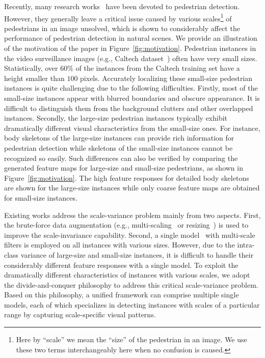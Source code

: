 \documentclass[journal]{IEEEtran}
\begin{document}
Recently, many research works~\cite{ta_cnn,compact,ouyang2013joint,sermanet2013pedestrian} have been devoted to pedestrian detection. However, they generally leave a critical issue caused by various scales\footnote{Here by ``scale'' we mean the ``size'' of the pedestrian in an image. We  use these two terms interchangeably here when no confusion is caused.} of pedestrians in an image unsolved, which is shown to considerably affect the performance of pedestrian detection in natural scenes. We provide an illustration of the motivation of the paper in Figure~\ref{fig:motivation}. Pedestrian instances in the video surveillance images (e.g., Caltech dataset~\cite{dollar2012pedestrian}) often have very small sizes. Statistically, over $60\%$ of the instances from the Caltech training set have a height smaller than $100$ pixels. Accurately localizing these small-size pedestrian instances is quite challenging due to the following difficulties. Firstly, most of the small-size instances appear with blurred boundaries and obscure appearance. It is difficult to distinguish them from the background clutters and other overlapped instances. Secondly, the large-size pedestrian instances typically exhibit dramatically different visual characteristics from the small-size ones. For instance, body skeletons of the large-size instances can provide rich information for pedestrian detection  while  skeletons of the small-size instances cannot be recognized so easily.  
Such differences can also be verified by comparing the generated feature maps for large-size and small-size pedestrians, as shown in Figure~\ref{fig:motivation}. The high feature responses for detailed body skeletons are shown for the large-size instances while only coarse feature maps are obtained for small-size instances. 

Existing works address the scale-variance problem mainly from two aspects. First, the brute-force data augmentation (e.g., multi-scaling~\cite{girshick2015fast} or resizing~\cite{girshick2014rich}) is used to improve the scale-invariance capability.  
Second, a single model~\cite{gong2014multi}\cite{xu2014scale} with multi-scale filters is employed on all instances with various sizes. However, due to the intra-class variance of large-size and small-size instances, it is difficult to handle their considerably different feature responses with a single model.  To exploit the dramatically different characteristics of instances with various scales, we adopt the divide-and-conquer philosophy to address this critical scale-variance problem. Based on this philosophy, a unified framework can comprise multiple single models, each of which specializes in detecting instances with scales of a particular range by capturing scale-specific visual patterns. 
\end{document}
